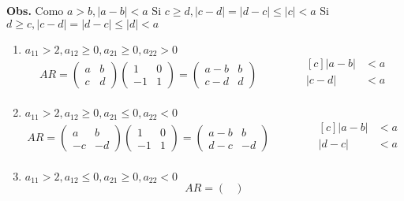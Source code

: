 \documentclass{article}
\newcommand\tab[1][0.6cm]{\hspace*{#1}}
\newcommand\nl{\newline\tab}
\begin{document}
\begin{enumerate}
\begin{enumerate}
			\textbf{Obs.} \nl Como $a > b, |a - b| < a$ \nl
							  Si $c \geq d, |c - d| = |d - c|\leq |c| < a$
							  \nl 
			Si  $d \geq c, |c - d| = |d - c|\leq |d| < a$
			\begin{enumerate}
				\item  $a_{11} > 2, a_{12} \geq 0, a_{21} \geq 0, a_{22} > 0 $\nl
				$$
				AR = 
				\begin{pmatrix}
				a & b \\
				c & d 
				\end{pmatrix} 
				\begin{pmatrix}
				1 & 0 \\
				-1 & 1 
				\end{pmatrix} = 
				\begin{pmatrix}
				a-b & b \\
				c-d & d 
				\end{pmatrix}
				\qquad\qquad
				\begin{aligned}[c]
				|a - b| &< a\\
				|c - d| &< a\\
				\end{aligned}
				$$
				\item $a_{11} > 2, a_{12} \geq 0, a_{21} \leq 0, a_{22} < 0$ \nl
				$$
				AR = 
				\begin{pmatrix}
				a & b \\
				-c & -d 
				\end{pmatrix} 
				\begin{pmatrix}
				1 & 0 \\
				-1 & 1 
				\end{pmatrix} = 
				\begin{pmatrix}
				a-b & b \\
				d-c & -d 
				\end{pmatrix}
				\qquad\qquad
				\begin{aligned}[c]
				|a - b| &< a\\
				|d - c| &< a\\
				\end{aligned}			
				$$
				\item $a_{11} > 2, a_{12} \leq 0, a_{21} \geq 0, a_{22} < 0$ \nl
				$$
				AR = 
				\begin{pmatrix}

\end{pmatrix}$$
\end{enumerate}
\end{enumerate}
\end{enumerate}
\end{document}
